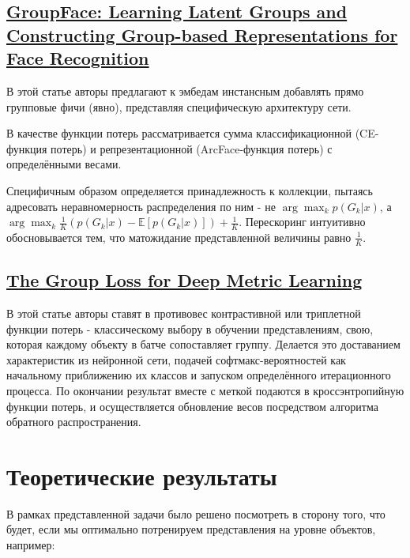 \documentclass{article}
\begin{document}
\subsection{\href{https://arxiv.org/pdf/2005.10497v2.pdf}{GroupFace: Learning Latent Groups and Constructing Group-based
Representations for Face Recognition}}

В этой статье авторы предлагают к эмбедам инстансным добавлять прямо групповые фичи (явно), представляя специфическую архитектуру сети. 

В качестве функции потерь рассматривается сумма классификационной (CE-функция потерь) и репрезентационной (ArcFace-функция потерь) с определёнными весами. 

Специфичным образом определяется принадлежность к коллекции, пытаясь адресовать неравномерность распределения по ним - не 
$\arg\max_k p(G_k | x)$, а $\arg\max_k \frac{1}{K}(p(G_k | x) - \mathbb{E}[p(G_k | x)]) + \frac{1}{K}$.
Перескоринг интуитивно обосновывается тем, что матожидание представленной величины равно $\frac{1}{K}$.

\subsection{\href{https://arxiv.org/pdf/1912.00385.pdf}{The Group Loss for Deep Metric Learning}}

В этой статье авторы ставят в противовес контрастивной или триплетной функции потерь - классическому выбору в обучении представлениям, свою, которая каждому объекту в батче сопоставляет группу. Делается это доставанием характеристик из нейронной сети, подачей софтмакс-вероятностей как начальному приближению их классов и запуском определённого итерационного процесса. По окончании результат вместе с меткой подаются в кроссэнтропийную функции потерь, и осуществляется обновление весов посредством алгоритма обратного распространения.

\section{Теоретические результаты}

В рамках представленной задачи было решено посмотреть в сторону того, что будет, если мы оптимально потренируем представления на уровне объектов, например:
\end{document}
